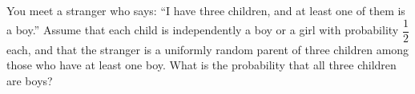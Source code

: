 You meet a stranger who says: ``I have three children, and at least one of them is a boy.'' Assume that each child is independently a boy or a girl with probability $\dfrac{1}{2}$ each, and that the stranger is a uniformly random parent of three children among those who have at least one boy. What is the probability that all three children are boys?
